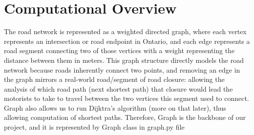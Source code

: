 \documentclass[fontsize=11pt]{article}
\begin{document}
 \section{Computational Overview}
The road network is represented as a weighted directed graph, where each vertex represents an intersection or road endpoint in Ontario, and each edge represents a road segment connecting two of those vertices with a weight representing the distance between them in meters. This graph structure directly models the road network because roads inherently connect two points, and removing an edge in the graph mirrors a real-world road/segment of road closure: allowing the analysis of which road path (next shortest path) that closure would lead the motorists to take to travel between the two vertices this segment used to connect. Graph also allows us to run Dijktra's algorithm (more on that later), thus allowing computation of shortest paths. Therefore, Graph is the backbone of our project, and it is represented by Graph class in graph.py file\\ 
\end{document}
